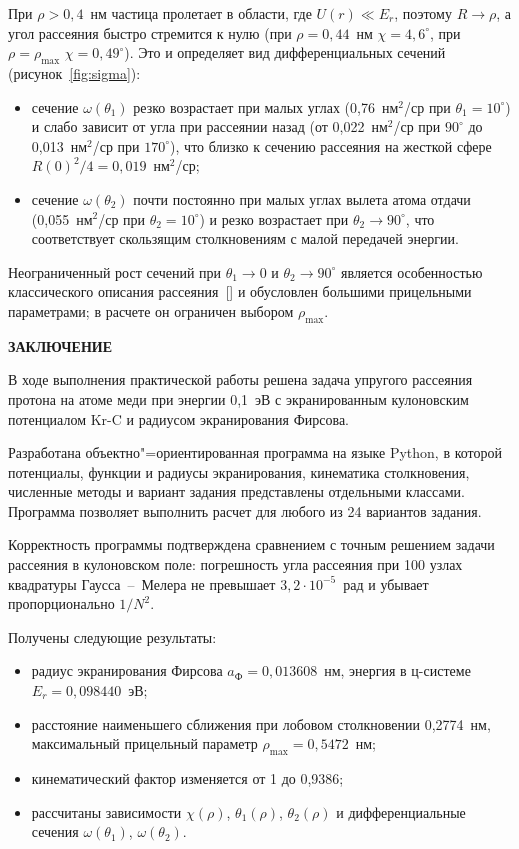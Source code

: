 \documentclass[a4paper,14pt]{extarticle}
\newcommand{\structuralelement}[1]{%
  \clearpage\phantomsection
  \addcontentsline{toc}{section}{#1}%
  {\centering\bfseries #1\par}\vspace{18pt}}
\newcommand{\citeitem}[1]{\citesep\ref{#1}\def\citesep{,~}}
\newcommand{\cit}[1]{[\def\citesep{}\forcsvlist{\citeitem}{#1}]}
\begin{document}
При $\rho > 0{,}4$~нм частица пролетает в области, где $U(r) \ll E_r$,
поэтому $R \to \rho$, а угол рассеяния быстро стремится к нулю
(при $\rho = 0{,}44$~нм $\chi = 4{,}6^\circ$, при $\rho = \rho_{\max}$
$\chi = 0{,}49^\circ$). Это и определяет вид дифференциальных сечений
(рисунок~\ref{fig:sigma}):
\begin{itemize}
  \item сечение $\omega(\theta_1)$ резко возрастает при малых углах
        (0,76~нм$^2$/ср при $\theta_1 = 10^\circ$) и слабо зависит от угла при
        рассеянии назад (от 0,022~нм$^2$/ср при $90^\circ$ до 0,013~нм$^2$/ср
        при $170^\circ$), что близко к сечению рассеяния на жесткой сфере
        $R(0)^2/4 = 0{,}019$~нм$^2$/ср;
  \item сечение $\omega(\theta_2)$ почти постоянно при малых углах вылета
        атома отдачи (0,055~нм$^2$/ср при $\theta_2 = 10^\circ$) и резко
        возрастает при $\theta_2 \to 90^\circ$, что соответствует
        скользящим столкновениям с малой передачей энергии.
\end{itemize}

Неограниченный рост сечений при $\theta_1 \to 0$ и $\theta_2 \to 90^\circ$
является особенностью классического описания рассеяния~\cit{ref:manual}
и обусловлен большими прицельными параметрами; в расчете он ограничен
выбором $\rho_{\max}$.

\structuralelement{ЗАКЛЮЧЕНИЕ}

В ходе выполнения практической работы решена задача упругого рассеяния
протона на атоме меди при энергии 0,1~эВ с экранированным кулоновским
потенциалом Kr-C и радиусом экранирования Фирсова.

Разработана объектно"=ориентированная программа на языке Python, в которой
потенциалы, функции и радиусы экранирования, кинематика столкновения,
численные методы и вариант задания представлены отдельными классами.
Программа позволяет выполнить расчет для любого из 24 вариантов задания.

Корректность программы подтверждена сравнением с точным решением задачи
рассеяния в кулоновском поле: погрешность угла рассеяния при 100 узлах
квадратуры Гаусса~--~Мелера не превышает $3{,}2\cdot 10^{-5}$~рад
и убывает пропорционально $1/N^2$.

Получены следующие результаты:
\begin{itemize}
  \item радиус экранирования Фирсова $a_\text{Ф} = 0{,}013608$~нм,
        энергия в ц-системе $E_r = 0{,}098440$~эВ;
  \item расстояние наименьшего сближения при лобовом столкновении
        0,2774~нм, максимальный прицельный параметр
        $\rho_{\max} = 0{,}5472$~нм;
  \item кинематический фактор изменяется от 1 до 0,9386;
  \item рассчитаны зависимости $\chi(\rho)$, $\theta_1(\rho)$,
        $\theta_2(\rho)$ и дифференциальные сечения $\omega(\theta_1)$,
        $\omega(\theta_2)$.
\end{itemize}
\end{document}
